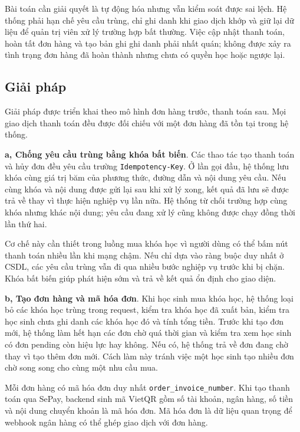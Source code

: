 \documentclass[../DoAn.tex]{subfiles}
\begin{document}
Bài toán cần giải quyết là tự động hóa nhưng vẫn kiểm soát được sai lệch. Hệ thống phải hạn chế yêu cầu trùng, chỉ ghi danh khi giao dịch khớp và giữ lại dữ liệu để quản trị viên xử lý trường hợp bất thường. Việc cập nhật thanh toán, hoàn tất đơn hàng và tạo bản ghi ghi danh phải nhất quán; không được xảy ra tình trạng đơn hàng đã hoàn thành nhưng chưa có quyền học hoặc ngược lại.

\subsection{Giải pháp}
\label{section:5.4.2}

Giải pháp được triển khai theo mô hình đơn hàng trước, thanh toán sau. Mọi giao dịch thanh toán đều được đối chiếu với một đơn hàng đã tồn tại trong hệ thống.

\textbf{a, Chống yêu cầu trùng bằng khóa bất biến}. Các thao tác tạo thanh toán và hủy đơn đều yêu cầu trường \texttt{Idempotency-Key}. Ở lần gọi đầu, hệ thống lưu khóa cùng giá trị băm của phương thức, đường dẫn và nội dung yêu cầu. Nếu cùng khóa và nội dung được gửi lại sau khi xử lý xong, kết quả đã lưu sẽ được trả về thay vì thực hiện nghiệp vụ lần nữa. Hệ thống từ chối trường hợp cùng khóa nhưng khác nội dung; yêu cầu đang xử lý cũng không được chạy đồng thời lần thứ hai.

Cơ chế này cần thiết trong luồng mua khóa học vì người dùng có thể bấm nút thanh toán nhiều lần khi mạng chậm. Nếu chỉ dựa vào ràng buộc duy nhất ở CSDL, các yêu cầu trùng vẫn đi qua nhiều bước nghiệp vụ trước khi bị chặn. Khóa bất biến giúp phát hiện sớm và trả về kết quả ổn định cho giao diện.

\textbf{b, Tạo đơn hàng và mã hóa đơn}. Khi học sinh mua khóa học, hệ thống loại bỏ các khóa học trùng trong request, kiểm tra khóa học đã xuất bản, kiểm tra học sinh chưa ghi danh các khóa học đó và tính tổng tiền. Trước khi tạo đơn mới, hệ thống làm hết hạn các đơn chờ quá thời gian và kiểm tra xem học sinh có đơn pending còn hiệu lực hay không. Nếu có, hệ thống trả về đơn đang chờ thay vì tạo thêm đơn mới. Cách làm này tránh việc một học sinh tạo nhiều đơn chờ song song cho cùng một nhu cầu mua.

Mỗi đơn hàng có mã hóa đơn duy nhất \texttt{order\_invoice\_number}. Khi tạo thanh toán qua SePay, backend sinh mã VietQR gồm số tài khoản, ngân hàng, số tiền và nội dung chuyển khoản là mã hóa đơn. Mã hóa đơn là dữ liệu quan trọng để webhook ngân hàng có thể ghép giao dịch với đơn hàng.
\end{document}
